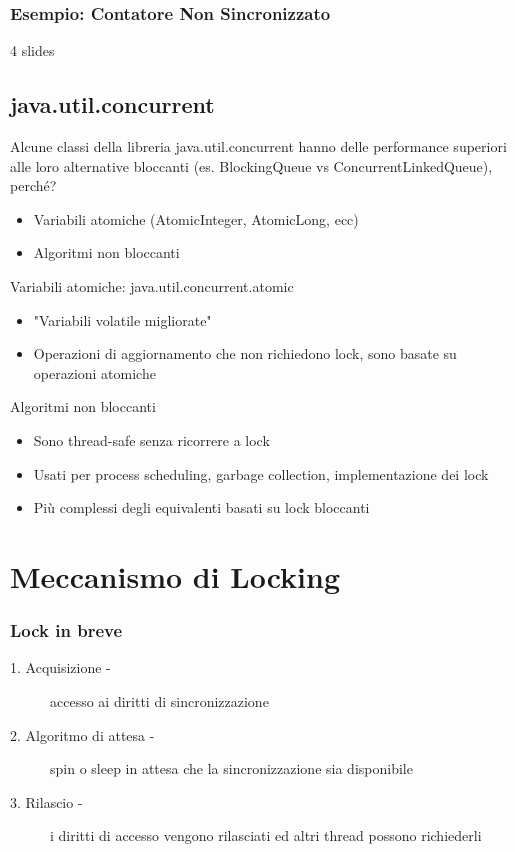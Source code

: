 \subsubsection{Esempio: Contatore Non Sincronizzato}
4 slides

\subsection{java.util.concurrent}
Alcune classi della libreria java.util.concurrent hanno delle performance superiori alle loro alternative bloccanti (es. BlockingQueue vs
ConcurrentLinkedQueue), perché?
\begin{itemize}
    \item Variabili atomiche (AtomicInteger, AtomicLong, ecc)
    \item Algoritmi non bloccanti
\end{itemize}
Variabili atomiche: java.util.concurrent.atomic
\begin{itemize}
    \item "Variabili volatile migliorate"
    \item Operazioni di aggiornamento che non richiedono lock, sono basate su operazioni atomiche
\end{itemize}
Algoritmi non bloccanti
\begin{itemize}
    \item Sono thread-safe senza ricorrere a lock
    \item Usati per process scheduling, garbage collection, implementazione dei lock
    \item Più complessi degli equivalenti basati su lock bloccanti
\end{itemize}

\section{Meccanismo di Locking}
\subsubsection{Lock in breve}
\begin{description}
    \item[1. Acquisizione -] accesso ai diritti di sincronizzazione
    \item[2. Algoritmo di attesa -] spin o sleep in attesa che la sincronizzazione sia disponibile
    \item[3. Rilascio -] i diritti di accesso vengono rilasciati ed altri thread possono richiederli
\end{description}

